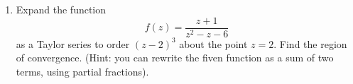 \documentclass[fleqn]{article}
\begin{document}
\begin{enumerate}
      \textcolor{hwColor}{
        $
          f(z)=f(z_0)+f^'(z_0)(z-z_0)+\dfrac{f^{''}(z_0)}{2!} (z-z_0)^2+\dfrac{f^{'''}(z_0)}{3!} (z-z_0)^3+... \\
          \\
          \\
          =f(1)+f^'(1)(z-1)+\dfrac{f^{''}(1)}{2!} (z-1)^2+\dfrac{f^{'''}(1)}{3!} (z-1)^3+... \\ 
          \\
          \\
          =\dfrac{1}{2}-\dfrac{1}{4}(z-1)+\dfrac{\dfrac{2}{2^3}}{2!} (z-1)^2-\dfrac{\dfrac{6}{2^4}}{3!} (z-1)^3 \\
          \\
          \\
          \\
          \therefore ~~~ f(z)=\sum\limits_{n=0}^{\infty} \left(-\dfrac{1}{2}\right)^n (z-1)^n \\
          \\
          \\
          \\
          \dfrac{1}{R}=\lim\limits_{n \to \infty} |\dfrac{a_{n+1}}{a_n}|=\lim\limits_{n \to \infty} \Big|\dfrac{(-\dfrac{1}{2})^n+1}{(-\dfrac{1}{2})^n}\Big| \\
          \\
          \\
          \therefore ~~~ R=2  \\
        $
        \\
        The region of convergence is inside a circle centered a $1$ with a radius of $2$.
      }

    \item Expand the function
    $$f(z) = \frac{z + 1}{z^2 - z - 6}$$
    as a Taylor series to order $(z - 2)^3$ about the point $z = 2$. Find the region of convergence. (Hint: you can rewrite the fiven function as a sum of two terms, using partial fractions). 


\end{enumerate}
\end{document}
